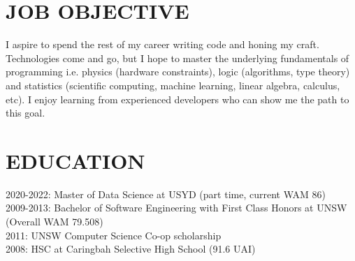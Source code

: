 \documentclass{res}
\begin{document}
 


\address{18 Eglington St \\  Lidcombe, NSW 2141
         \\  grasevski@gmail.com
         \\  0405 634 067
	 \\  github.com/grasevski}
                                  
\begin{resume}

\section{JOB OBJECTIVE}          
    I aspire to spend the rest of my career writing code and honing my craft. Technologies come and go, but I hope to master the underlying fundamentals of programming i.e. physics (hardware constraints), logic (algorithms, type theory) and statistics (scientific computing, machine learning, linear algebra, calculus, etc). I enjoy learning from experienced developers who can show me the path to this goal.
 
\section{EDUCATION}          
    2020-2022: Master of Data Science at USYD (part time, current WAM 86) \\
    2009-2013: Bachelor of Software Engineering with First Class Honors at UNSW (Overall WAM 79.508) \\
    2011: UNSW Computer Science Co-op scholarship \\
    2008: HSC at Caringbah Selective High School (91.6 UAI)

 

\end{resume}
\end{document}
